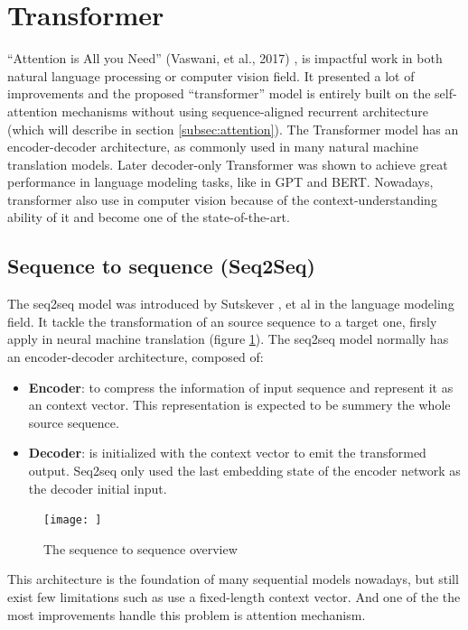 \section{Transformer}
\label{sec:transformer}
“Attention is All you Need” (Vaswani, et al., 2017) \cite{vaswani2017attention}, is impactful work in both natural language processing or computer vision field. It presented a lot of improvements and the proposed “transformer” model is entirely built on the self-attention mechanisms without using sequence-aligned recurrent architecture (which will describe in section \ref{subsec:attention}). The Transformer model has an encoder-decoder architecture, as commonly used in many natural machine translation models. Later decoder-only Transformer was shown to achieve great performance in language modeling tasks, like in GPT and BERT. Nowadays, transformer also use in computer vision because of the context-understanding ability of it and become one of the state-of-the-art.

\subsection{Sequence to sequence (Seq2Seq)}
The seq2seq model was introduced by Sutskever \cite{sutskever2014sequence}, et al in the language modeling field. It tackle the transformation of an source sequence to a target one, firsly apply in neural machine translation (figure \ref{fig:seq2seq}). The seq2seq model normally has an encoder-decoder architecture, composed of:

\begin{itemize}
    \item \textbf{Encoder}: to compress the information of input sequence and represent it as an context vector. This representation is expected to be summery the whole source sequence.
    \item \textbf{Decoder}: is initialized with the context vector to emit the transformed output. Seq2seq only used the last embedding state of the encoder network as the decoder initial input.
\end{itemize}
\begin{figure}
    \centering
    \texttt{[image: ]}
    \caption{The sequence to sequence overview}
    \label{fig:seq2seq}
\end{figure}
This architecture is the foundation of many sequential models nowadays, but still exist few limitations such as use a fixed-length context vector. And one of the the most improvements handle this problem is attention mechanism.

